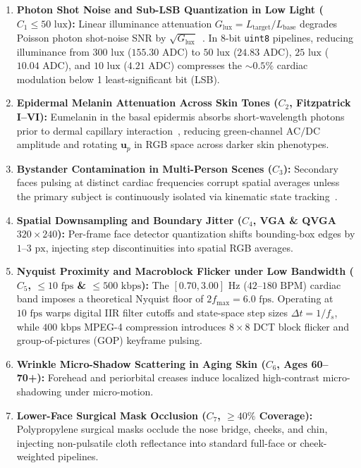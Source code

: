 \documentclass[conference]{IEEEtran}
\begin{document}
\begin{enumerate}\setlength{\itemsep}{1.5pt}\setlength{\parskip}{0pt}
    \item \textbf{Photon Shot Noise and Sub-LSB Quantization in Low Light ($C_1 \le 50\text{ lux}$):} Linear illuminance attenuation $G_{\text{lux}} = L_{\text{target}} / L_{\text{base}}$ degrades Poisson photon shot-noise SNR by $\sqrt{G_{\text{lux}}}$~\cite{mathworks_imnoise}. In 8-bit \texttt{uint8} pipelines, reducing illuminance from $300\text{ lux}$ ($155.30\text{ ADC}$) to $50\text{ lux}$ ($24.83\text{ ADC}$), $25\text{ lux}$ ($10.04\text{ ADC}$), and $10\text{ lux}$ ($4.21\text{ ADC}$) compresses the $\sim 0.5\%$ cardiac modulation below 1 least-significant bit (LSB).
    \item \textbf{Epidermal Melanin Attenuation Across Skin Tones ($C_2$, Fitzpatrick I--VI):} Eumelanin in the basal epidermis absorbs short-wavelength photons prior to dermal capillary interaction~\cite{aipex2024}, reducing green-channel $\text{AC}/\text{DC}$ amplitude and rotating $\mathbf{u}_p$ in RGB space across darker skin phenotypes.
    \item \textbf{Bystander Contamination in Multi-Person Scenes ($C_3$):} Secondary faces pulsing at distinct cardiac frequencies corrupt spatial averages unless the primary subject is continuously isolated via kinematic state tracking~\cite{mathworks_tracking}.
    \item \textbf{Spatial Downsampling and Boundary Jitter ($C_4$, VGA \& QVGA $320\times 240$):} Per-frame face detector quantization shifts bounding-box edges by $1\text{--}3\text{ px}$, injecting step discontinuities into spatial RGB averages.
    \item \textbf{Nyquist Proximity and Macroblock Flicker under Low Bandwidth ($C_5$, $\le 10\text{ fps}$ \& $\le 500\text{ kbps}$):} The $[0.70, 3.00]\text{ Hz}$ ($42\text{--}180\text{ BPM}$) cardiac band imposes a theoretical Nyquist floor of $2 f_{\max} = 6.0\text{ fps}$. Operating at $10\text{ fps}$ warps digital IIR filter cutoffs and state-space step sizes $\Delta t = 1/f_s$, while $400\text{ kbps}$ MPEG-4 compression introduces $8\times 8$ DCT block flicker and group-of-pictures (GOP) keyframe pulsing.
    \item \textbf{Wrinkle Micro-Shadow Scattering in Aging Skin ($C_6$, Ages 60--70+):} Forehead and periorbital creases induce localized high-contrast micro-shadowing under micro-motion.
    \item \textbf{Lower-Face Surgical Mask Occlusion ($C_7$, $\ge 40\%$ Coverage):} Polypropylene surgical masks occlude the nose bridge, cheeks, and chin, injecting non-pulsatile cloth reflectance into standard full-face or cheek-weighted pipelines.
\end{enumerate}
\end{document}

